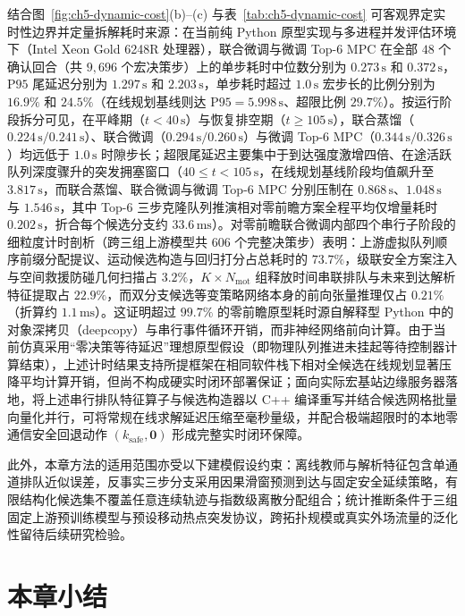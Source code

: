 结合图~\ref{fig:ch5-dynamic-cost}(b)--(c) 与表~\ref{tab:ch5-dynamic-cost} 可客观界定实时性边界并定量拆解耗时来源：在当前纯 Python 原型实现与多进程并发评估环境下（Intel Xeon Gold 6248R 处理器），联合微调与微调 Top-6 MPC 在全部 $48$ 个确认回合（共 $9{,}696$ 个宏决策步）上的单步耗时中位数分别为 $0.273\,\mathrm{s}$ 和 $0.372\,\mathrm{s}$，$\mathrm{P95}$ 尾延迟分别为 $1.297\,\mathrm{s}$ 和 $2.203\,\mathrm{s}$，单步耗时超过 $1.0\,\mathrm{s}$ 宏步长的比例分别为 $16.9\%$ 和 $24.5\%$（在线规划基线则达 $\mathrm{P95}=5.998\,\mathrm{s}$、超限比例 $29.7\%$）。按运行阶段拆分可见，在平峰期（$t<40\,\mathrm{s}$）与恢复排空期（$t\geq 105\,\mathrm{s}$），联合蒸馏（$0.224\,\mathrm{s}/\allowbreak 0.241\,\mathrm{s}$）、联合微调（$0.294\,\mathrm{s}/\allowbreak 0.260\,\mathrm{s}$）与微调 Top-6 MPC（$0.344\,\mathrm{s}/\allowbreak 0.326\,\mathrm{s}$）均远低于 $1.0\,\mathrm{s}$ 时隙步长；超限尾延迟主要集中于到达强度激增四倍、在途活跃队列深度骤升的突发拥塞窗口（$40\leq t<105\,\mathrm{s}$，在线规划基线阶段均值飙升至 $3.817\,\mathrm{s}$，而联合蒸馏、联合微调与微调 Top-6 MPC 分别压制在 $0.868\,\mathrm{s}$、$1.048\,\mathrm{s}$ 与 $1.546\,\mathrm{s}$，其中 Top-6 三步克隆队列推演相对零前瞻方案全程平均仅增量耗时 $0.202\,\mathrm{s}$，折合每个候选分支约 $33.6\,\mathrm{ms}$）。对零前瞻联合微调内部四个串行子阶段的细粒度计时剖析（跨三组上游模型共 $606$ 个完整决策步）表明：上游虚拟队列顺序前缀分配提议、运动候选构造与回归打分占总耗时的 $73.7\%$，级联安全方案注入与空间救援防碰几何扫描占 $3.2\%$，$K\times N_{\mathrm{mot}}$ 组释放时间串联排队与未来到达解析特征提取占 $22.9\%$，而双分支候选等变策略网络本身的前向张量推理仅占 $0.21\%$（折算约 $1.1\,\mathrm{ms}$）。这证明超过 $99.7\%$ 的零前瞻原型耗时源自解释型 Python 中的对象深拷贝（deepcopy）与串行事件循环开销，而非神经网络前向计算。由于当前仿真采用“零决策等待延迟”理想原型假设（即物理队列推进未挂起等待控制器计算结束），上述计时结果支持所提框架在相同软件栈下相对全候选在线规划显著压降平均计算开销，但尚不构成硬实时闭环部署保证；面向实际宏基站边缘服务器落地，将上述串行排队特征算子与候选构造器以 C++ 编译重写并结合候选网格批量向量化并行，可将常规在线求解延迟压缩至毫秒量级，并配合极端超限时的本地零通信安全回退动作 $(k_{\mathrm{safe}},\mathbf{0})$ 形成完整实时闭环保障。

此外，本章方法的适用范围亦受以下建模假设约束：离线教师与解析特征包含单通道排队近似误差，反事实三步分支采用因果滑窗预测到达与固定安全延续策略，有限结构化候选集不覆盖任意连续轨迹与指数级离散分配组合；统计推断条件于三组固定上游预训练模型与预设移动热点突发协议，跨拓扑规模或真实外场流量的泛化性留待后续研究检验。

\section{本章小结}
\label{sec:ch5-discussion}
\label{sec:ch5-summary}

